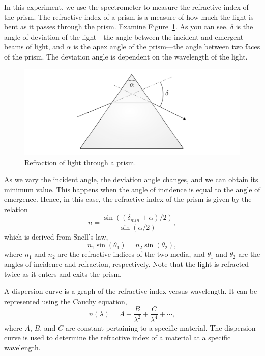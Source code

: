 \documentclass[10pt]{article}
\begin{document}
In this experiment, we use the spectrometer to measure the refractive index of the prism. The refractive index of a prism is a measure of how much the light is bent as it passes through the prism. Examine Figure~\ref{fig:1}. As you can see, $\delta$ is the angle of deviation of the light---the angle between the incident and emergent beams of light, and $\alpha$ is the apex angle of the prism---the angle between two faces of the prism. The deviation angle is dependent on the wavelength of the light.
\begin{figure}[ht]
    \centering
    \includegraphics[scale=0.6]{figures/f1.pdf}
    \caption{Refraction of light through a prism.}
    \label{fig:1}
\end{figure}
As we vary the incident angle, the deviation angle changes, and we can obtain its minimum value. This happens when the angle of incidence is equal to the angle of emergence. Hence, in this case, the refractive index of the prism is given by the relation
\begin{equation}
    \label{eq:1}
    n = \frac{\sin\left((\delta_{min}+\alpha) / 2 \right)}{\sin\left(\alpha / 2\right)},
\end{equation}
which is derived from Snell's law,
\begin{equation}
    n_1 \sin(\theta_1) = n_2 \sin(\theta_2),
\end{equation}
where $n_1$ and $n_2$ are the refractive indices of the two media, and $\theta_1$ and $\theta_2$ are the angles of incidence and refraction, respectively. Note that the light is refracted twice as it enters and exits the prism. 

A dispersion curve is a graph of the refractive index versus wavelength. It can be represented using the Cauchy equation,
\begin{equation}
    n(\lambda) = A + \frac{B}{\lambda^2} + \frac{C}{\lambda^4} + \cdots,
\end{equation}
where $A$, $B$, and $C$ are constant pertaining to a specific material. The dispersion curve is used to determine the refractive index of a material at a specific wavelength.
\end{document}
